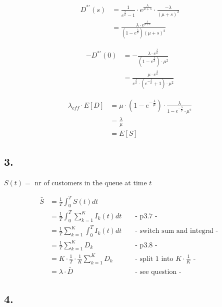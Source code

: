 \begin{align*}
D^{\ast'}\left(s\right)&=\frac{1}{e^{{\frac{\lambda }{\mu }}}-1}\cdot e^{{\frac{\lambda }{\mu +s}}}\cdot \frac{-\lambda }{\left(\mu +s\right)^{2}}\\
&=\frac{\lambda \cdot e^{{\frac{\lambda }{\mu +s}}}}{\left(1-e^{{\frac{\lambda }{\mu }}}\right)\left(\mu +s\right)^{2}}
\end{align*}

\begin{align*}
-D^{\ast'}\left(0\right)&=-\frac{\lambda \cdot e^{{\frac{\lambda }{\mu }}}}{\left(1-e^{{\frac{\lambda }{\mu }}}\right)\cdot \mu ^{2}}\\
&=\frac{\mu \cdot e^{{\frac{\lambda }{\mu }}}}{e^{{\frac{\lambda }{\mu }}}\cdot \left(e^{{-\frac{\lambda }{\mu }}}+1\right)\cdot \mu ^{2}}
\end{align*}

\begin{align*}
\lambda_{{eff}}\cdot E\left[D\right]&=\mu \cdot \left(1-e^{{-\frac{\lambda }{\mu }}}\right)\cdot \frac{\lambda }{1-e^{{-\frac{\lambda }{\mu }}}\cdot \mu ^{2}}\\
&=\frac{\lambda }{\mu }\\
&=E\left[S\right]
\end{align*}

\subsection*{ 3. }

$S\left(t\right)= $ nr of customers in the queue at time $t$

\begin{align*}
\bar{S}&=\frac{1}{T}\int _{0}^{T}S\left(t\right)dt\\
&=\frac{1}{T} \int _{0}^{T} \sum _{{k=1}}^{K}I_{k}\left(t\right) dt && \text{ - p3.7 - }\\
&=\frac{1}{T}\sum _{{k=1}}^{K}\int _{0}^{T}I_{k}\left(t\right)dt && \text{ - switch sum and integral - }\\
&=\frac{1}{T}\sum _{{k=1}}^{K}D_{k} && \text{ - p3.8 - }\\
&=K\cdot \frac{1}{T}\cdot \frac{1}{K}\sum _{{k=1}}^{K}D_{k} && \text{ - split 1 into $K \cdot \frac{1}{K}$ -}\\
&= \lambda \cdot \bar{D} && \text{ - see question - }
\end{align*}

\subsection*{ 4. }

